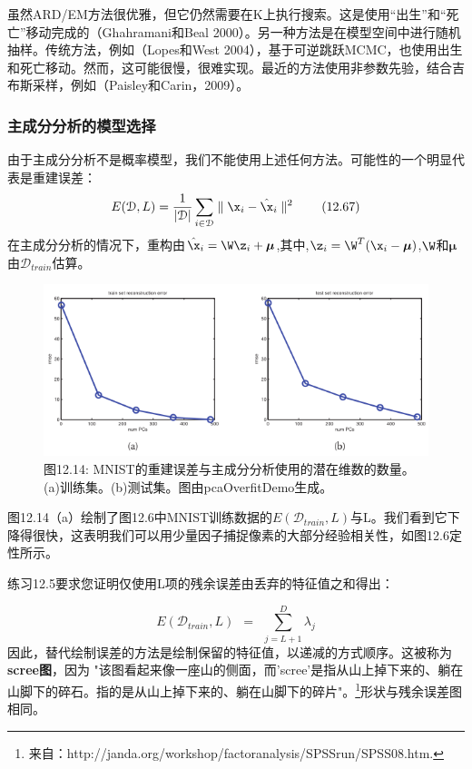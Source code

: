 \documentclass[a4paper]{article}
\begin{document}
虽然ARD/EM方法很优雅，但它仍然需要在K上执行搜索。这是使用“出生”和“死亡”移动完成的（Ghahramani和Beal 2000）。另一种方法是在模型空间中进行随机抽样。传统方法，例如（Lopes和West 2004），基于可逆跳跃MCMC，也使用出生和死亡移动。然而，这可能很慢，很难实现。最近的方法使用非参数先验，结合吉布斯采样，例如（Paisley和Carin，2009）。

\subsubsection{主成分分析的模型选择}

由于主成分分析不是概率模型，我们不能使用上述任何方法。可能性的一个明显代表是重建误差：
\begin{equation}
	E(\mathcal{D},L)=\frac{1}{|\mathcal{D}|}\sum_{i\in \mathcal{D}}\parallel\x_i-\hat{\x}_i\parallel^2\tag{12.67}
\end{equation}
在主成分分析的情况下，重构由$\hat{\x}_i=\W\z_i+\boldsymbol{\mu}$,其中,$\z_i=\W^T(\x_i-\boldsymbol{\mu})$,$\W$和$\boldsymbol{\mu}$由$\mathcal{D}_{train}$估算。

\begin{figure}[h]
	\centering
	\includegraphics[width=0.7\linewidth]{fig/figure14}
	\caption*{图12.14:  MNIST的重建误差与主成分分析使用的潜在维数的数量。(a)训练集。(b)测试集。图由pcaOverfitDemo生成。}
\end{figure}

图12.14（a）绘制了图12.6中MNIST训练数据的$E(\mathcal{D}_{train},L)$与L。我们看到它下降得很快，这表明我们可以用少量因子捕捉像素的大部分经验相关性，如图12.6定性所示。

练习12.5要求您证明仅使用L项的残余误差由丢弃的特征值之和得出： 

\begin{equation}
	E(\mathcal{D}_{train},L)\ \ =\ \ \sum_{j=L+1}^{D}\lambda_j\tag{12.68}
\end{equation}
因此，替代绘制误差的方法是绘制保留的特征值，以递减的方式顺序。这被称为\textbf{scree图}，因为 "该图看起来像一座山的侧面，而'scree'是指从山上掉下来的、躺在山脚下的碎石。指的是从山上掉下来的、躺在山脚下的碎片"。\footnote{来自：http://janda.org/workshop/factoranalysis/SPSSrun/SPSS08.htm.}形状与残余误差图相同。
\end{document}
